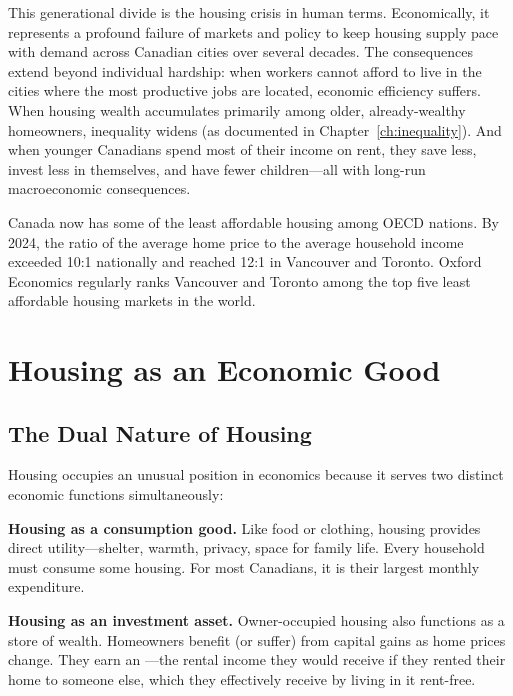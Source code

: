 This generational divide is the housing crisis in human terms. Economically, it represents a profound failure of markets and policy to keep housing supply pace with demand across Canadian cities over several decades. The consequences extend beyond individual hardship: when workers cannot afford to live in the cities where the most productive jobs are located, economic efficiency suffers. When housing wealth accumulates primarily among older, already-wealthy homeowners, inequality widens (as documented in Chapter~\ref{ch:inequality}). And when younger Canadians spend most of their income on rent, they save less, invest less in themselves, and have fewer children---all with long-run macroeconomic consequences.

Canada now has some of the least affordable housing among OECD nations. By 2024, the ratio of the average home price to the average household income exceeded 10:1 nationally and reached 12:1 in Vancouver and Toronto. Oxford Economics regularly ranks Vancouver and Toronto among the top five least affordable housing markets in the world.

\section{Housing as an Economic Good}

\subsection{The Dual Nature of Housing}

Housing occupies an unusual position in economics because it serves two distinct economic functions simultaneously:

\textbf{Housing as a consumption good.} Like food or clothing, housing provides direct utility---shelter, warmth, privacy, space for family life. Every household must consume some housing. For most Canadians, it is their largest monthly expenditure.

\textbf{Housing as an investment asset.} Owner-occupied housing also functions as a store of wealth. Homeowners benefit (or suffer) from capital gains as home prices change. They earn an ---the rental income they would receive if they rented their home to someone else, which they effectively receive by living in it rent-free.

